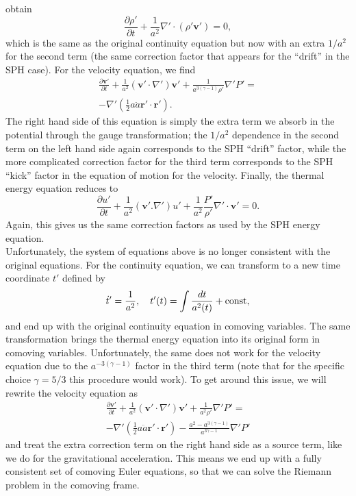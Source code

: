 obtain
\begin{equation}
\frac{\partial{} \rho{}'}{\partial{} t} + \frac{1}{a^2} \nabla{}' \cdot \left(
\rho{}' \mathbf{v}' \right) = 0,
\end{equation}
which is the same as the original continuity equation but now with an extra
$1/a^2$ for the second term (the same correction factor that appears
for the ``drift'' in the SPH case). For the velocity equation, we find
\begin{multline}
\frac{\partial{} \mathbf{v}'}{\partial{} t} + \frac{1}{a^2} \left( \mathbf{v}' \cdot
\nabla{}' \right) \mathbf{v}' + \frac{1}{a^{3(\gamma{} - 1)}\rho{}'}
\nabla{}' P' = \\
- \nabla{}' \left( \frac{1}{2} a \ddot{a} \mathbf{r}'\cdot\mathbf{r}'
\right).
\end{multline}
The right hand side of this equation is simply the extra term we absorb in the
potential through the gauge transformation; the $1/a^2$ dependence in the
second term on the left hand side again corresponds to the SPH ``drift'' factor,
while the more complicated correction factor for the third term corresponds
to the SPH ``kick'' factor in the equation of motion for the
velocity. Finally, the thermal energy equation reduces to
\begin{equation}
\frac{\partial{} u'}{\partial{} t} + \frac{1}{a^2} \left( \mathbf{v}' .
\nabla{}' \right) u' + \frac{1}{a^2} \frac{P'}{\rho{}'} \nabla{}' \cdot \mathbf{v}'
= 0.
\end{equation}
Again, this gives us the same correction factors as used by the SPH energy
equation.\\

Unfortunately, the system of equations above is no longer consistent with the
original equations. For the continuity equation, we can transform to a new
time coordinate $t'$ defined by
\begin{equation}
\dot{t}' = \frac{1}{a^2}, \quad{} t'(t) = \int \frac{dt}{a^2(t)} + {\rm{}const,}
\end{equation}
and end up with the original continuity equation in comoving variables. The
same transformation brings the thermal energy equation into its original form
in comoving variables. Unfortunately, the same does not work for the velocity
equation due to the $a^{-3(\gamma{}-1)}$ factor in the third term (note that
for the specific choice $\gamma{}=5/3$ this procedure would work).
To get around this issue, we will rewrite the velocity equation as
\begin{multline}
\frac{\partial{} \mathbf{v}'}{\partial{} t} + \frac{1}{a^2} \left(
\mathbf{v}' \cdot
\nabla{}' \right) \mathbf{v}' + \frac{1}{a^2\rho{}'}
\nabla{}' P' = \\
- \nabla{}' \left( \frac{1}{2} a \ddot{a} \mathbf{r}'\cdot\mathbf{r}'
\right) - \frac{a^2 - a^{3(\gamma{}-1)}}{a^{3\gamma{} - 1}} \nabla{}'P'
\end{multline}
and treat the extra correction term on the right hand side as a source term,
like we do for the gravitational acceleration. This means we end up with
a fully consistent set of comoving Euler equations, so that we can solve the
Riemann problem in the comoving frame.

